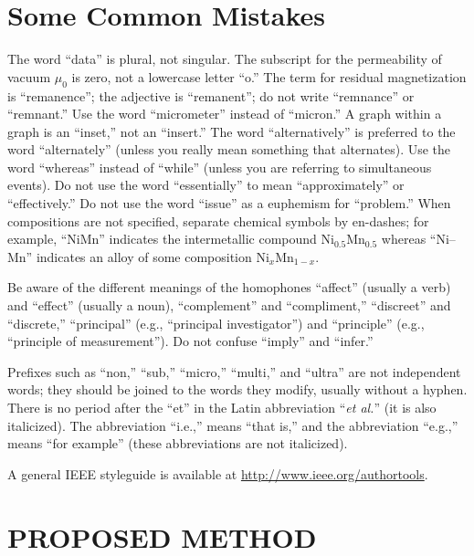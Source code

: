 \documentclass{ieeeaccess}
\begin{document}
\section{Some Common Mistakes}
The word ``data'' is plural, not singular. The subscript for the
permeability of vacuum $\mu _{0}$ is zero, not a lowercase letter
``o.'' The term for residual magnetization is ``remanence''; the adjective
is ``remanent''; do not write ``remnance'' or ``remnant.'' Use the word
``micrometer'' instead of ``micron.'' A graph within a graph is an
``inset,'' not an ``insert.'' The word ``alternatively'' is preferred to the
word ``alternately'' (unless you really mean something that alternates). Use
the word ``whereas'' instead of ``while'' (unless you are referring to
simultaneous events). Do not use the word ``essentially'' to mean
``approximately'' or ``effectively.'' Do not use the word ``issue'' as a
euphemism for ``problem.'' When compositions are not specified, separate
chemical symbols by en-dashes; for example, ``NiMn'' indicates the
intermetallic compound Ni$_{0.5}$Mn$_{0.5}$ whereas
``Ni--Mn'' indicates an alloy of some composition
Ni$_{x}$Mn$_{1-x}$.

Be aware of the different meanings of the homophones ``affect'' (usually a
verb) and ``effect'' (usually a noun), ``complement'' and ``compliment,''
``discreet'' and ``discrete,'' ``principal'' (e.g., ``principal
investigator'') and ``principle'' (e.g., ``principle of measurement''). Do
not confuse ``imply'' and ``infer.''

Prefixes such as ``non,'' ``sub,'' ``micro,'' ``multi,'' and ``ultra'' are
not independent words; they should be joined to the words they modify,
usually without a hyphen. There is no period after the ``et'' in the Latin
abbreviation ``\emph{et al.}'' (it is also italicized). The abbreviation ``i.e.,'' means
``that is,'' and the abbreviation ``e.g.,'' means ``for example'' (these
abbreviations are not italicized).

A general IEEE styleguide is available at \break
\underline{http://www.ieee.org/authortools}.

\section{PROPOSED METHOD}
\end{document}
